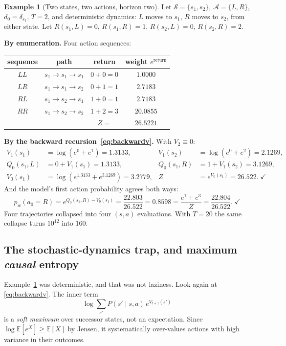 \documentclass[11pt]{article}
\theoremstyle{plain}
\theoremstyle{definition}
\newtheorem{example}[theorem]{Example}
\theoremstyle{remark}
\renewcommand{\S}{\mathcal{S}}
\newcommand{\A}{\mathcal{A}}
\newcommand{\E}{\mathbb{E}}
\begin{document}
\begin{example}[Two states, two actions, horizon two]\label{ex:worked}
Let $\S=\{s_1,s_2\}$, $\A=\{L,R\}$, $d_0=\delta_{s_1}$, $T=2$, and
deterministic dynamics: $L$ moves to $s_1$, $R$ moves to $s_2$, from
either state. Let $R(s_1,L)=0$, $R(s_1,R)=1$, $R(s_2,L)=0$, $R(s_2,R)=2$.

\textbf{By enumeration.} Four action sequences:
\begin{center}
\begin{tabular}{@{}cccc@{}}
\toprule
sequence & path & return & weight $e^{\text{return}}$\\
\midrule
$LL$ & $s_1\to s_1\to s_1$ & $0+0=0$ & $1.0000$\\
$LR$ & $s_1\to s_1\to s_2$ & $0+1=1$ & $2.7183$\\
$RL$ & $s_1\to s_2\to s_1$ & $1+0=1$ & $2.7183$\\
$RR$ & $s_1\to s_2\to s_2$ & $1+2=3$ & $20.0855$\\
\midrule
& & $Z=$ & $26.5221$\\
\bottomrule
\end{tabular}
\end{center}

\textbf{By the backward recursion~\eqref{eq:backwardv}.} With $V_2\equiv0$:
\begin{align*}
V_1(s_1) &= \log(e^0+e^1) = 1.3133, & V_1(s_2) &= \log(e^0+e^2) = 2.1269,\\
Q_0(s_1,L) &= 0 + V_1(s_1) = 1.3133, & Q_0(s_1,R) &= 1 + V_1(s_2) = 3.1269,\\
V_0(s_1) &= \log(e^{1.3133}+e^{3.1269}) = 3.2779, & Z &= e^{V_0(s_1)} = 26.522. \;\checkmark
\end{align*}
And the model's first action probability agrees both ways:
\begin{equation*}
p_w(a_0=R) = e^{Q_0(s_1,R) - V_0(s_1)} = \frac{22.803}{26.522} = 0.8598
= \frac{e^1+e^3}{Z} = \frac{22.804}{26.522}. \;\checkmark
\end{equation*}
Four trajectories collapsed into four $(s,a)$ evaluations. With $T=20$ the
same collapse turns $10^{12}$ into $160$.
\end{example}

\subsection{The stochastic-dynamics trap, and maximum \emph{causal} entropy}
\label{sec:causaltrap}

Example~\ref{ex:worked} was deterministic, and that was not laziness. Look
again at \eqref{eq:backwardv}. The inner term
\begin{equation}
\log \sum_{s'} P(s'\mid s,a)\, e^{V_{t+1}(s')}
\label{eq:innersoftmax}
\end{equation}
is a \emph{soft maximum} over successor states, not an expectation. Since
$\log\E[e^X] \ge \E[X]$ by Jensen, it systematically over-values actions
with high variance in their outcomes.
\end{document}
